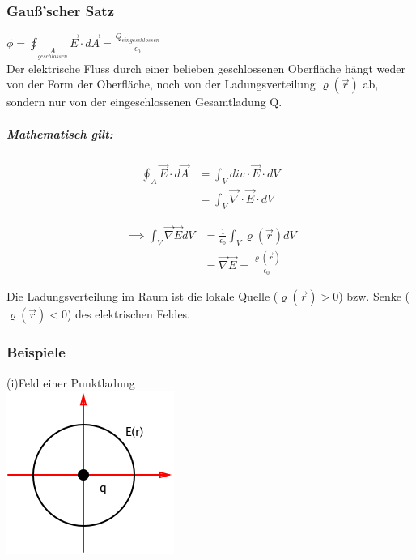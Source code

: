 \documentclass[11pt]{article}
\begin{document}
\subsubsection{Gauß'scher Satz}

$\boxed{\displaystyle\phi=\oint_{\underset{geschlossen}{A}}\vec{E}\cdot d\vec{A}=\frac{Q_{eingeschlossen}}{\epsilon_0}}$\\

Der elektrische Fluss durch einer belieben geschlossenen Oberfläche hängt weder von der Form der Oberfläche, noch von der Ladungsverteilung $\varrho(\vec{r})$ ab, sondern nur von der eingeschlossenen Gesamtladung Q.\\

\subparagraph{Mathematisch gilt:}

\begin{align*}
	\oint_{A}\vec{E}\cdot d\vec{A}&=\int_{V} div\cdot \vec{E}\cdot dV\\
	&=\int_{V}\vec{\nabla}\cdot\vec{E}\cdot dV
\end{align*}

\begin{align*}
	\implies \int_{V}\vec{\nabla}\vec{E}dV & =\frac{1}{\epsilon_0}\int_{V}\varrho(\vec{r})dV\\
	&=\vec{\nabla}\vec{E}=\frac{\varrho(\vec{r})}{\epsilon_0}
\end{align*}

Die Ladungsverteilung im Raum ist die lokale Quelle ($\varrho(\vec{r})>0$) bzw. Senke ($\varrho(\vec{r})<0$) des elektrischen Feldes.

\subsubsection{Beispiele}

(i)Feld einer Punktladung\\

\includegraphics{skizzen/14/14_6B2}\\
\end{document}
